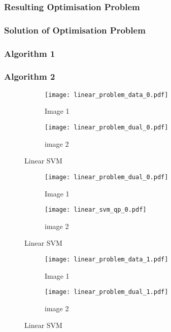 \documentclass[10pt, a4paper,reqno]{amsart}
\begin{document}
\subsubsection{Resulting Optimisation Problem}


\subsubsection{Solution of Optimisation Problem}


\subsubsection{Algorithm 1}


\subsubsection{Algorithm 2}


\begin{figure}[H]
	\centering	
	\begin{subfigure}{1.0\textwidth}
		\centering
		\texttt{[image: linear\_problem\_data\_0.pdf]}
		\caption{Image 1}
	\end{subfigure}
	\begin{subfigure}{1.0\textwidth}
		\centering
		\texttt{[image: linear\_problem\_dual\_0.pdf]}
		\caption{image 2}
	\end{subfigure}
	\caption{Linear SVM}
\end{figure}

\begin{figure}[H]
	\centering	
	\begin{subfigure}{1.0\textwidth}
		\centering
		\texttt{[image: linear\_problem\_dual\_0.pdf]}
		\caption{Image 1}
	\end{subfigure}
	\begin{subfigure}{1.0\textwidth}
		\centering
		\texttt{[image: linear\_svm\_qp\_0.pdf]}
		\caption{image 2}
	\end{subfigure}
	\caption{Linear SVM}
\end{figure}

\begin{figure}[H]
	\centering	
	\begin{subfigure}{1.0\textwidth}
		\centering
		\texttt{[image: linear\_problem\_data\_1.pdf]}
		\caption{Image 1}
	\end{subfigure}
	\begin{subfigure}{1.0\textwidth}
		\centering
		\texttt{[image: linear\_problem\_dual\_1.pdf]}
		\caption{image 2}
	\end{subfigure}
	\caption{Linear SVM}
\end{figure}
\end{document}

